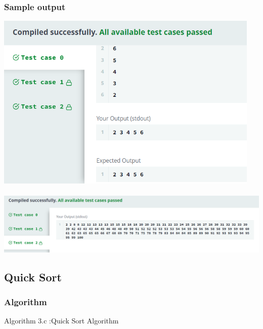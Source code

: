 \documentclass[14pt, letterpaper]{article}
\begin{document}
\subsubsection{Sample output}
\includegraphics[width=5in]{images/mergeSort1.png}\\ \\
\includegraphics[width=7in]{images/mergeSort2.png}
\newpage
\subsection{Quick Sort}
\subsubsection{Algorithm}
\hline 
\vspace{0.1cm}
\hspace{0.5cm}Algorithm 3.c :Quick Sort Algorithm
\vspace{0.1cm}
\hline
\end{document}
